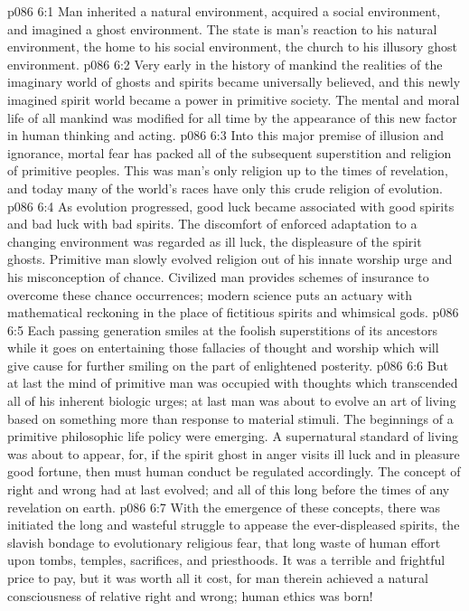 \vs p086 6:1 Man inherited a natural environment, acquired a social environment, and imagined a ghost environment. The state is man’s reaction to his natural environment, the home to his social environment, the church to his illusory ghost environment.
\vs p086 6:2 Very early in the history of mankind the realities of the imaginary world of ghosts and spirits became universally believed, and this newly imagined spirit world became a power in primitive society. The mental and moral life of all mankind was modified for all time by the appearance of this new factor in human thinking and acting.
\vs p086 6:3 Into this major premise of illusion and ignorance, mortal fear has packed all of the subsequent superstition and religion of primitive peoples. This was man’s only religion up to the times of revelation, and today many of the world’s races have only this crude religion of evolution.
\vs p086 6:4 As evolution progressed, good luck became associated with good spirits and bad luck with bad spirits. The discomfort of enforced adaptation to a changing environment was regarded as ill luck, the displeasure of the spirit ghosts. Primitive man slowly evolved religion out of his innate worship urge and his misconception of chance. Civilized man provides schemes of insurance to overcome these chance occurrences; modern science puts an actuary with mathematical reckoning in the place of fictitious spirits and whimsical gods.\plusone
\vs p086 6:5 Each passing generation smiles at the foolish superstitions of its ancestors while it goes on entertaining those fallacies of thought and worship which will give cause for further smiling on the part of enlightened posterity.
\pc \vs p086 6:6 But at last the mind of primitive man was occupied with thoughts which transcended all of his inherent biologic urges; at last man was about to evolve an art of living based on something more than response to material stimuli. The beginnings of a primitive philosophic life policy were emerging. A supernatural standard of living was about to appear, for, if the spirit ghost in anger visits ill luck and in pleasure good fortune, then must human conduct be regulated accordingly. The concept of right and wrong had at last evolved; and all of this long before the times of any revelation on earth.
\vs p086 6:7 With the emergence of these concepts, there was initiated the long and wasteful struggle to appease the ever\hyp{}displeased spirits, the slavish bondage to evolutionary religious fear, that long waste of human effort upon tombs, temples, sacrifices, and priesthoods. It was a terrible and frightful price to pay, but it was worth all it cost, for man therein achieved a natural consciousness of relative right and wrong; human ethics was born!
